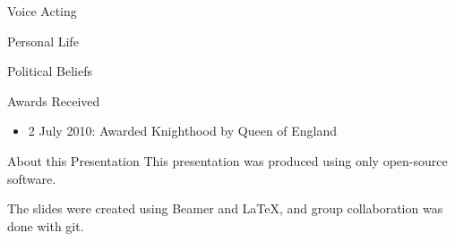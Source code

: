 \documentclass[xcolor=dvipsnames]{beamer}
\begin{document}
\begin{frame}{Voice Acting}

\end{frame}

\begin{frame}{Personal Life}

\end{frame}

\begin{frame}{Political Beliefs}

\end{frame}

\begin{frame}{Awards Received}
  \begin{itemize}
    \item 2 July 2010: Awarded Knighthood by Queen of England
  \end{itemize}
  \end{frame}
\begin{frame}{About this Presentation}
  This presentation was produced using only open-source software.

  The slides were created using Beamer and LaTeX, and group collaboration was done
  with git.
\end{frame}
\end{document}
